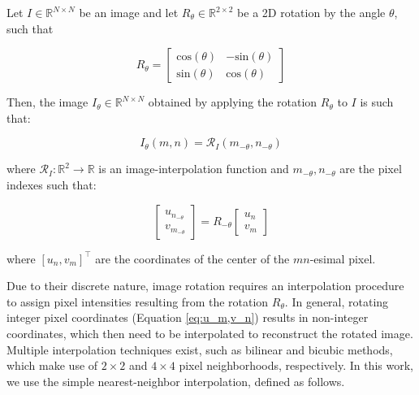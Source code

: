 \begin{definition}
    \label{def:I_theta}
    Let $I\in\mathbb{R}^{N\times N}$ be an image and let $R_\theta \in \mathbb{R}^{2\times 2}$ be a 2D rotation by the angle $\theta$, such that

    \begin{equation}
        R_\theta =
        \begin{bmatrix}
            \mathrm{cos}(\theta) & -\mathrm{sin}(\theta)\\
            \mathrm{sin}(\theta) & \mathrm{cos}(\theta)
        \end{bmatrix}
    \end{equation}
    
 Then, the image $I_\theta \in \mathbb{R}^{N\times N}$ obtained by applying the rotation $R_\theta$ to $I$ is such that:

    \begin{equation}
        I_\theta(m,n) = \mathcal{R}_I(m_{-\theta},n_{-\theta})
  \end{equation}

  where $\mathcal{R}_I:\mathbb{R}^2 \rightarrow \mathbb{R}$ is an image-interpolation function and $m_{-\theta},n_{-\theta}$ are the pixel indexes such that:

  \begin{equation}
  \label{eq:u_m,v_n}
\begin{bmatrix}
u_{n_{-\theta}} \\
v_{m_{-\theta}}
\end{bmatrix} = R_{-\theta}
\begin{bmatrix}
u_{n} \\
v_{m}
\end{bmatrix}
\end{equation}

where $[u_n, v_m]^\top$ are the coordinates of the center of the $mn$-esimal pixel.

\end{definition}

Due to their discrete nature, image rotation requires an interpolation procedure to assign pixel intensities resulting from the rotation $R_\theta$. In general, rotating integer pixel coordinates (Equation \ref{eq:u_m,v_n}) results in non-integer coordinates, which then need to be interpolated to reconstruct the rotated image. Multiple interpolation techniques exist, such as bilinear and bicubic methods, which make use of $2\times 2$ and $4\times 4$ pixel neighborhoods, respectively\cite{castleman1996digital}. In this work, we use the simple nearest-neighbor interpolation, defined as follows.


